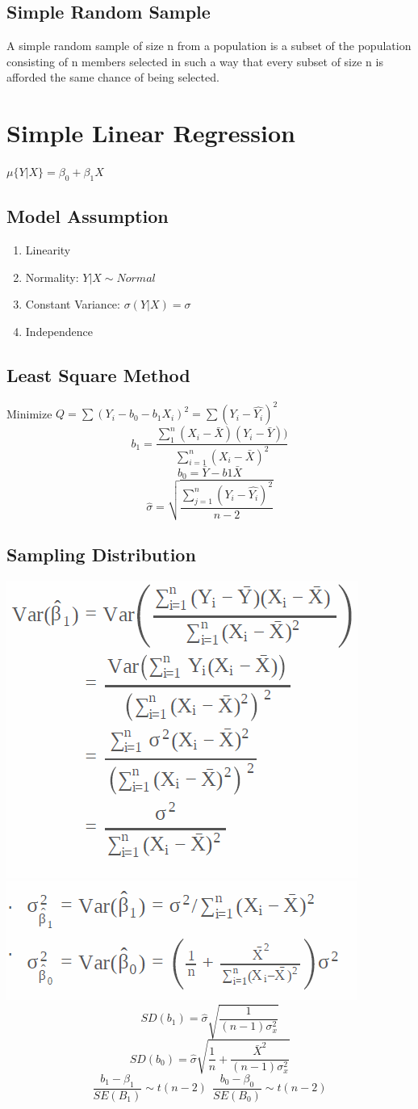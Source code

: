 \documentclass[10pt,landscape, fleqn]{article}
\begin{document}
\begin{multicols}{3}
			\subsection{Simple Random Sample}
				A simple random sample of size n from a population is a subset of the 	population consisting of n members selected in such a way that every subset of size n is afforded the same chance of being selected.
			
		\section{Simple Linear Regression}
			$\mu\{Y|X\} = \beta_0 + \beta_1X$
			\subsection{Model Assumption}
				\begin{enumerate}
					\item Linearity
					\item Normality: ${Y|X} \sim Normal$
					\item Constant Variance: $\sigma(Y|X)=\sigma$
					\item Independence
				\end{enumerate}
			\subsection{Least Square Method}
				Minimize $ Q = \sum(Y_i - b_0 - b_1X_i)^2 = \sum(Y_i - \hat{Y_i})^2 $
				\[b_1 = \frac{\sum_{1}^{n}(X_i-\bar{X})(Y_i-\bar{Y}))}{\sum_{i=1}^{n}(X_i-\bar{X})^2} \]
				\[b_0 = \bar{Y} - b1\bar{X} \]
				\[ \hat{\sigma}=\sqrt{\frac{\sum_{j=1}^{n}(Y_i-\hat{Y_i})^2}{n-2}} \]
			\subsection{Sampling Distribution}
				\includegraphics[width=0.6\linewidth]{slr1}
				\includegraphics[width=0.7\linewidth]{slr2}
				\[ SD(b_1) = \hat{\sigma}\sqrt{\frac{1}{(n-1)\sigma_x^2}} \]
				\[ SD(b_0) = \hat{\sigma}\sqrt{\frac{1}{n} + \frac{\bar{X}^2}{(n-1)\sigma_x^2}} \]
				\[ \frac{b_1-\beta_1}{SE(B_1)} \sim t(n-2) \ \ \frac{b_0-\beta_0}{SE(B_0)} \sim t(n-2) \]

\end{multicols}
\end{document}
